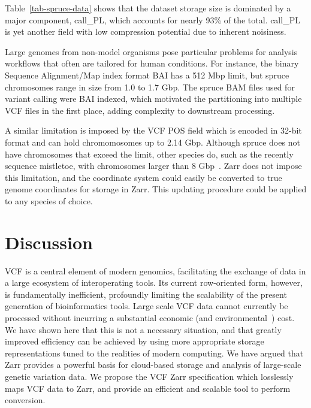 \documentclass[a4paper,num-refs]{oup-contemporary}
\begin{document}
Table~\ref{tab-spruce-data} shows that the dataset storage size is
dominated by a major component, call\_PL, which accounts for nearly
93\% of the total. call\_PL is yet another field with low compression
potential due to inherent noisiness.

Large genomes from non-model organisms pose particular problems for
analysis workflows that often are tailored for human conditions. For
instance, the binary Sequence Alignment/Map index format BAI has a 512
Mbp limit, but spruce chromosomes range in size from 1.0 to 1.7 Gbp.
The spruce BAM files used for variant calling were BAI indexed, which
motivated the partitioning into multiple VCF files in the first place,
adding complexity to downstream processing.

A similar limitation is imposed by the VCF POS field which is encoded
in 32-bit format and can hold chromomosomes up to 2.14 Gbp. Although
spruce does not have chromosomes that exceed the limit, other species
do, such as the recently sequence mistletoe, with chromosomes larger
than 8 Gbp~\cite{dtol_mistletoe}. Zarr does not impose this
limitation, and the coordinate system could easily be converted to
true genome coordinates for storage in Zarr. This updating procedure
could be applied to any species of choice.

\section{Discussion}
VCF is a central element of modern genomics, facilitating
the exchange of data in a large ecosystem of interoperating tools. 
Its current row-oriented form, however,
is fundamentally inefficient,
profoundly limiting the scalability of the present generation
of bioinformatics tools. Large scale VCF data cannot 
currently be 
processed without incurring a substantial economic
(and environmental~\cite{grealey2022carbon}) cost.
We have shown here that this is not a necessary situation,
and that greatly improved efficiency can be achieved by 
using more appropriate storage representations tuned
to the realities of modern computing. We have argued that 
Zarr provides a powerful basis for cloud-based
storage and analysis of large-scale genetic variation data.
We propose the VCF Zarr specification which losslessly
maps VCF data to Zarr, and provide an efficient and scalable
tool to perform conversion.
\end{document}
